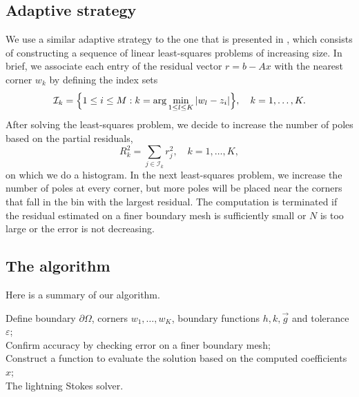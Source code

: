 \subsection{Adaptive strategy}
We use a similar adaptive strategy to the one that is presented in \cite{gopal19}, which consists of constructing a sequence of linear least-squares problems of increasing size. In brief, we associate each entry of the residual vector $r=b-Ax$ with the nearest corner $w_k$ by defining the index sets
\begin{equation}
\mathcal{I}_k = \Big\{1\leq i\leq M : k=\arg\min_{1\leq l \leq K} \abs{w_l-z_i}\Big\},\quad k=1,\ldots, K.
\end{equation}
After solving the least-squares problem, we decide to increase the number of poles based on the partial residuals, 
\begin{equation}
R_k^2 = \sum_{j\in \mathcal{I}_k} r_j^2,\quad k=1,\ldots, K,
\end{equation}
on which we do a histogram. In the next least-squares problem, we increase the number of poles at every corner, but more poles will be placed near the corners that fall in the bin with the largest residual. The computation is terminated if the residual estimated on a finer boundary mesh is sufficiently small or $N$ is too large or the error is not decreasing.


\subsection{The algorithm}
Here is a summary of our algorithm. 

\begin{algorithm}[H]
	\SetAlgoLined
	Define boundary $\partial \Omega$, corners $w_1,\ldots,w_K$, boundary functions $h,k,\vec{g}$ and tolerance $\varepsilon$;\\
	Confirm accuracy by checking error on a finer boundary mesh;\\
	Construct a function to evaluate the solution based on the computed coefficients $x$;\\
	\caption{The lightning Stokes solver.}
\end{algorithm}
